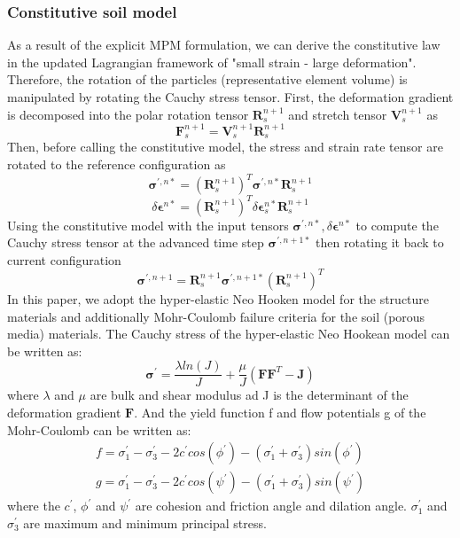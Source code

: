 \documentclass[preprint,12pt]{elsarticle}
\begin{document}
\subsubsection{Constitutive soil model}
As a result of the explicit MPM formulation, we can derive the constitutive law in the updated Lagrangian framework of "small strain - large deformation". Therefore, the rotation of the particles (representative element volume) is manipulated by rotating the Cauchy stress tensor. First, the deformation gradient is decomposed into the polar rotation tensor $\pmb{R}_s^{n+1}$ and stretch tensor $\pmb{V}_s^{n+1}$ as
%
%
\begin{equation}
     \pmb{F}_s^{n+1} = \pmb{V}_s^{n+1} \pmb{R}_s^{n+1}
\end {equation}
%
%
Then, before calling the constitutive model, the stress and strain rate tensor are rotated to the reference configuration as
%
%
\begin{equation}
     \pmb{\sigma}^{\prime,n*} =  (\pmb{R}_s^{n+1})^T \pmb{\sigma}^{\prime,n*} \pmb{R}_s^{n+1}
\end {equation}
%
%
\begin{equation}
    \delta \pmb{\epsilon}^{n*} =  (\pmb{R}_s^{n+1})^T \delta \pmb{\epsilon}_s^{n*} \pmb{R}_s^{n+1}
\end {equation}
%
%
Using the constitutive model with the input tensors $\pmb{\sigma}^{\prime,n*}, \delta \pmb{\epsilon}^{n*}$ to compute the Cauchy stress tensor at the advanced time step $\pmb{\sigma}^{\prime,n+1*}$ then rotating it back to current configuration
%
%
\begin{equation}
    \pmb{\sigma}^{\prime,n+1} =  \pmb{R}_s^{n+1} \pmb{\sigma}^{\prime,n+1*} (\pmb{R}_s^{n+1})^T
\end {equation}
%
%
In this paper, we adopt the hyper-elastic Neo Hooken model for the structure materials and additionally Mohr-Coulomb failure criteria for the soil (porous media) materials. The Cauchy stress of the hyper-elastic Neo Hookean model can be written as:
%
%
\begin{equation}
    \pmb{\sigma}^{\prime} =  \frac{ \lambda ln(J)}{J} + \frac{\mu}{J} (\pmb{F} \pmb{F}^T - \pmb{J})
\end {equation}
%
%
where $\lambda$ and $\mu$ are bulk and shear modulus ad J is the determinant of the deformation gradient $\pmb{F}$. And the yield function f and flow potentials g of the Mohr-Coulomb can be written as:
%
%
\begin{equation}
\begin{gathered}
   f =  \sigma_1^{\prime} -  \sigma_3^{\prime} -2c^{\prime} cos(\phi^{\prime}) - (\sigma_1^{\prime} +  \sigma_3^{\prime})sin(\phi^{\prime})\\
   g =  \sigma_1^{\prime} -  \sigma_3^{\prime} -2c^{\prime} cos(\psi^{\prime}) - (\sigma_1^{\prime} +  \sigma_3^{\prime})sin(\psi^{\prime})
\end {gathered}
\end {equation}
%
%
where the $c^{\prime}$, $\phi^{\prime}$ and $\psi^{\prime}$ are cohesion and friction angle and dilation angle. $\sigma_1^{\prime}$ and $\sigma_3^{\prime}$ are maximum and minimum principal stress.
\end{document}
